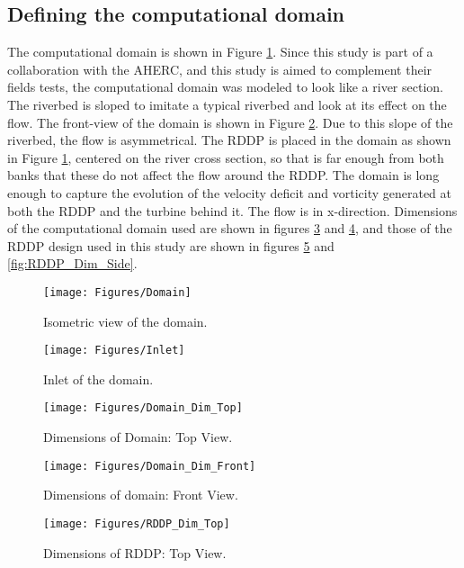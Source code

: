 \subsection*{Defining the computational domain}
The computational domain is shown in Figure \ref{fig:Domain}. Since this study is part of a collaboration with the AHERC, and this study is aimed to complement their fields tests, the computational domain was modeled to look like a river section. The riverbed is sloped to imitate a typical riverbed and look at its effect on the flow. The front-view of the domain is shown in Figure \ref{fig:Inlet}. Due to this slope of the riverbed, the flow is asymmetrical. The RDDP is placed in the domain as shown in Figure \ref{fig:Domain}, centered on the river cross section, so that is far enough from both banks that these do not affect the flow around the RDDP. The domain is long enough to capture the evolution of the velocity deficit and vorticity generated at both the RDDP and the turbine behind it. The flow is in x-direction. Dimensions of the computational domain used are shown in figures \ref{fig:Domain_Dim_Top} and \ref{fig:Domain_Dim_Front}, and those of the RDDP design used in this study are shown in figures \ref{fig:RDDP_Dim_Top} and \ref{fig:RDDP_Dim_Side}.\\

\begin{figure}
\centering
\texttt{[image: Figures/Domain]}
\caption{\label{fig:Domain}Isometric view of the domain.}
\end{figure}

\begin{figure}
\centering
\texttt{[image: Figures/Inlet]}
\caption{\label{fig:Inlet}Inlet of the domain.}
\end{figure}

\begin{figure}
\centering
\texttt{[image: Figures/Domain\_Dim\_Top]}
\caption{\label{fig:Domain_Dim_Top}Dimensions of Domain: Top View.}
\end{figure}

\begin{figure}
\centering
\texttt{[image: Figures/Domain\_Dim\_Front]}
\caption{\label{fig:Domain_Dim_Front}Dimensions of domain: Front View.}
\end{figure}

\begin{figure}
\centering
\texttt{[image: Figures/RDDP\_Dim\_Top]}
\caption{\label{fig:RDDP_Dim_Top}Dimensions of RDDP: Top View.}
\end{figure}


